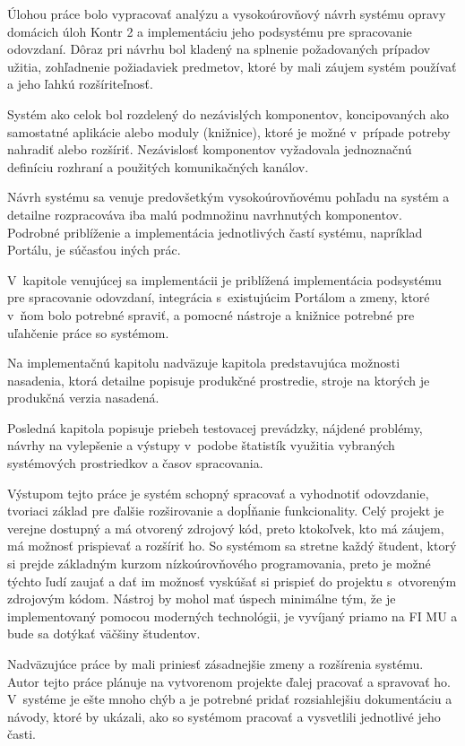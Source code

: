 \documentclass[
  digital, %
  oneside, %
  table,   %
  lof,     %
  lot,   %
]{fithesis3}
\begin{document}
Úlohou práce bolo vypracovať analýzu a vysokoúrovňový návrh systému opravy domácich úloh Kontr 2 a implementáciu jeho podsystému pre spracovanie odovzdaní. 
Dôraz pri návrhu bol kladený na splnenie požadovaných prípadov užitia, zohľadnenie požiadaviek predmetov, ktoré by mali záujem systém používať a jeho ľahkú rozšíriteľnosť.

Systém ako celok bol rozdelený do nezávislých komponentov, koncipovaných ako samostatné aplikácie alebo moduly (knižnice), ktoré je možné v~prípade potreby nahradiť alebo rozšíriť. Nezávislosť komponentov vyžadovala jednoznačnú definíciu rozhraní a použitých komunikačných kanálov.

Návrh systému sa venuje predovšetkým vysokoúrovňovému pohľadu na systém a detailne rozpracováva iba malú podmnožinu navrhnutých komponentov. Podrobné priblíženie a implementácia jednotlivých častí systému, napríklad Portálu, je súčasťou iných prác.

V~kapitole venujúcej sa implementácii je priblížená implementácia podsystému pre spracovanie odovzdaní, integrácia s~existujúcim Portálom a zmeny, ktoré v~ňom bolo potrebné spraviť, a pomocné nástroje a knižnice potrebné pre uľahčenie práce so systémom.

Na implementačnú kapitolu nadväzuje kapitola predstavujúca možnosti nasadenia, ktorá detailne popisuje produkčné prostredie, stroje na ktorých je produkčná verzia nasadená. 

Posledná kapitola popisuje priebeh testovacej prevádzky, nájdené problémy, návrhy na vylepšenie a výstupy v~podobe štatistík využitia vybraných systémových prostriedkov a časov spracovania.

Výstupom tejto práce je systém schopný spracovať a vyhodnotiť odovzdanie, tvoriaci základ pre ďalšie rozširovanie a dopĺňanie funkcionality. Celý projekt je verejne dostupný a má otvorený zdrojový kód, preto ktokoľvek, kto má záujem, má možnosť prispievať a rozšíriť ho. So systémom sa stretne každý študent, ktorý si prejde základným kurzom nízkoúrovňového programovania, preto je možné týchto ľudí zaujať a dať im možnosť vyskúšať si prispieť do projektu s~otvoreným zdrojovým kódom. 
Nástroj by mohol mať úspech minimálne tým, že je implementovaný pomocou moderných technológii, je vyvíjaný priamo na FI MU a bude sa dotýkať väčšiny študentov.

Nadväzujúce práce by mali priniesť zásadnejšie zmeny a rozšírenia systému. Autor tejto práce plánuje na vytvorenom projekte ďalej pracovať a spravovať ho. V~systéme je ešte mnoho chýb a je potrebné pridať rozsiahlejšiu dokumentáciu a návody, ktoré by ukázali, ako so systémom pracovať a vysvetlili jednotlivé jeho časti.
\end{document}
